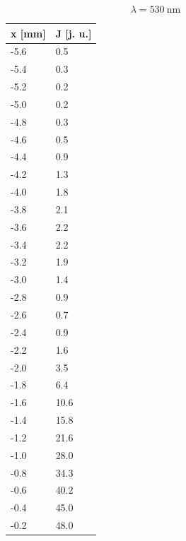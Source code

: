 \documentclass{fizykalab}
\begin{document}
{\[ \lambda = \SI{530}{\nano\meter} \]

\begin{figure}[htp]
	\begin{minipage}[t]{0.5\textwidth}

		\begin{minipage}[t]{0.5\textwidth}
				\begin{tabular}{|p{3.5em}|p{3.5em}|}
					\hline
					\textbf{x [mm]} & \textbf{J [j. u.]} \\ \hline\hline
					-5.6 & 0.5 \\ \hline
					-5.4 & 0.3 \\ \hline
					-5.2 & 0.2 \\ \hline
					-5.0 & 0.2 \\ \hline
					-4.8 & 0.3 \\ \hline
					-4.6 & 0.5 \\ \hline
					-4.4 & 0.9 \\ \hline
					-4.2 & 1.3 \\ \hline
					-4.0 & 1.8 \\ \hline
					-3.8 & 2.1 \\ \hline
					-3.6 & 2.2 \\ \hline
					-3.4 & 2.2 \\ \hline
					-3.2 & 1.9 \\ \hline
					-3.0 & 1.4 \\ \hline
					-2.8 & 0.9 \\ \hline
					-2.6 & 0.7 \\ \hline
					-2.4 & 0.9 \\ \hline
					-2.2 & 1.6 \\ \hline
					-2.0 & 3.5 \\ \hline
					-1.8 & 6.4 \\ \hline
					-1.6 & 10.6 \\ \hline
					-1.4 & 15.8 \\ \hline
					-1.2 & 21.6 \\ \hline
					-1.0 & 28.0 \\ \hline
					-0.8 & 34.3 \\ \hline
					-0.6 & 40.2 \\ \hline
					-0.4 & 45.0 \\ \hline
					-0.2 & 48.0 \\ \hline
				\end{tabular}
		\end{minipage}%
		\hfill
		\begin{minipage}[t]{0.5\textwidth}

\end{minipage}
\end{minipage}
\end{figure}}
\end{document}
